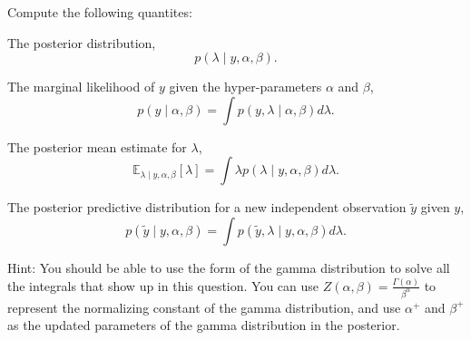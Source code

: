 \documentclass{article}
\def\blu#1{{\color{blu}#1}}
\def\cond{\; | \;}
\def\enum#1{\begin{enumerate}#1\end{enumerate}}
\begin{document}
Compute the following quantites:
\enum{
\item \blu{The posterior distribution,
\[
p(\lambda \cond y,\alpha, \beta).
\]
}
\item \blu{The marginal likelihood of $y$ given the hyper-parameters $\alpha$ and $\beta$,
\[
p(y\cond \alpha, \beta) = \int p(y,\lambda\cond \alpha, \beta)d\lambda.
\]
\pagebreak
\item \blu{The posterior mean estimate for $\lambda$,
\[
\mathbb{E}_{\lambda\cond y,\alpha,\beta}[\lambda] = \int \lambda p(\lambda \cond y,\alpha,\beta)d\lambda.
\]}
}
\item \blu{The posterior predictive distribution for a new independent observation $\tilde{y}$ given $y$,
\[
p(\tilde{y}\cond y,\alpha,\beta) =  \int p(\tilde{y},\lambda\cond y,\alpha,\beta)d\lambda.
\]
}
}
 Hint: 
You should be able to use the form of the gamma distribution to solve all the integrals that show up in this question. You can use $Z(\alpha, \beta) = \frac{\Gamma(\alpha)}{\beta^\alpha}$ to represent the normalizing constant of the gamma distribution, and use $\alpha^+$ and $\beta^+$ as the updated parameters of the gamma distribution in the posterior.
\end{document}
